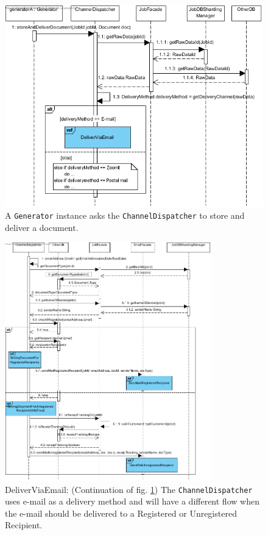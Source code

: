 \documentclass[a4paper,10pt]{article}
\begin{document}
\begin{figure}[!htp]
    \centering
    \includegraphics[width=\textwidth]{InitiateDocumentDelivery.png}
    \caption{A \texttt{Generator} instance asks the \texttt{ChannelDispatcher} to store and deliver a document.
        }\label{fig:seq_InitiateDocumentdelivery}
\end{figure}

\begin{figure}[!htp]
    \centering
    \includegraphics[width=0.8\textwidth]{DeliverViaEmail.png}
    \caption{DeliverViaEmail: (Continuation of  fig. \ref{fig:seq_InitiateDocumentdelivery}) The  \texttt{ChannelDispatcher} uses e-mail as a delivery method and will have a different flow when the e-mail should be delivered to a Registered or Unregistered Recipient.
        }\label{fig:seq_DeliverViaEmail}
\end{figure}
\end{document}

